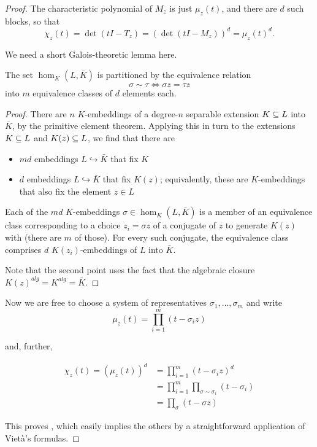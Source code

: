 \begin{proof}
  The characteristic polynomial of $M_z$ is just $\mu_z(t)$, and there are $d$ such blocks, so that 
  \[ \chi_z(t) = \det(tI - T_z) = (\det (tI - M_z))^d = \mu_z(t)^d. \]

  We need a short Galois-theoretic lemma here.
  
  \begin{lemma}
  The set $\hom_K(L,\bar K)$ is partitioned by the equivalence relation \[
  \sigma \sim \tau \iff \sigma z = \tau z \] into $m$ equivalence classes of
  $d$ elements each.
  \end{lemma}

  \begin{proof}
  There are $n$ $K$-embeddings of a degree-$n$ separable extension
  $\ringExtension L K$ into $\bar K$, by the primitive element theorem.
  Applying this in turn to the extensions $\ringExtension L K$ and
  $\ringExtension L {K(z)}$, we find that there are
  
  \begin{itemize} 
    \item $md$ embeddings $L \hookrightarrow \bar K$ that fix $K$ 
    \item $d$ embeddings $L \hookrightarrow \bar K$ that fix $K(z)$;
      equivalently, these are $K$-embeddings that also fix the element $z\in L$ 
  \end{itemize}

  Each of the $md$ $K$-embeddings $\sigma \in \hom_K(L,\bar K)$ is a
  member of an equivalence class corresponding to a choice $z_i = \sigma z$ of
  a conjugate of $z$ to generate $K(z)$ with (there are $m$ of those). For
  every such conjugate, the equivalence class comprises $d$ $K(z_i)$-embeddings
  of $L$ into $\bar K$.

  Note that the second point uses the fact that the algebraic closure
  ${K(z)}^{alg} = K^{alg} = \bar K$.
  \end{proof}

  Now we are free to choose a system of representatives $\sigma_1,\ldots,\sigma_m$ and write
  \[ \mu_z(t) = \prod_{i=1}^m (t - \sigma_i z) \]

  and, further,

  \begin{align*}
    \chi_z(t) = (\mu_z(t))^d &= \prod_{i=1}^m (t-\sigma_i z)^d \\
                             &= \prod_{i=1}^m \prod_{\sigma\sim\sigma_i} (t-\sigma_i) \\
                             &= \prod_{\sigma} (t-\sigma z)
  \end{align*}
  
  This proves , which easily implies the others by a
  straightforward application of Viet\`a's formulas.
\end{proof}

